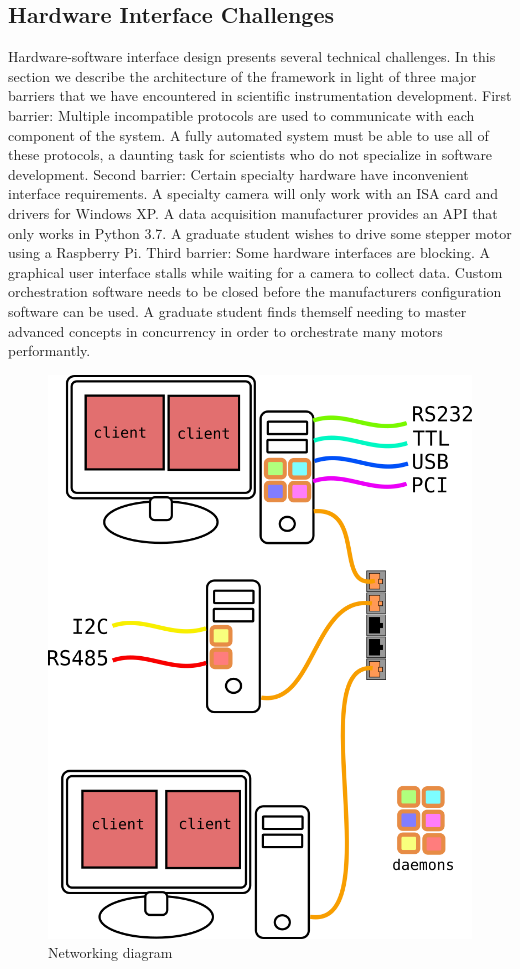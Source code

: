 \subsection{Hardware Interface Challenges}

Hardware-software interface design presents several technical challenges.
In this section we describe the architecture of the \yaq{} framework in light of three major barriers that we have encountered in scientific instrumentation development.
First barrier: Multiple incompatible protocols are used to communicate with each component of the system.
A fully automated system must be able to use all of these protocols, a daunting task for scientists who do not specialize in software development.
Second barrier: Certain specialty hardware have inconvenient interface requirements.
A specialty camera will only work with an ISA card and drivers for Windows XP.
A data acquisition manufacturer provides an API that only works in Python 3.7.
A graduate student wishes to drive some stepper motor using a Raspberry Pi.
Third barrier: Some hardware interfaces are blocking.
A graphical user interface stalls while waiting for a camera to collect data.
Custom orchestration software needs to be closed before the manufacturers configuration software can be used.
A graduate student finds themself needing to master advanced concepts in concurrency in order to orchestrate many motors performantly.

\begin{figure}
	\includegraphics[width=6in]{yaq/images/network}
\caption{\label{yaq:fig:network} Networking diagram}
\end{figure}

